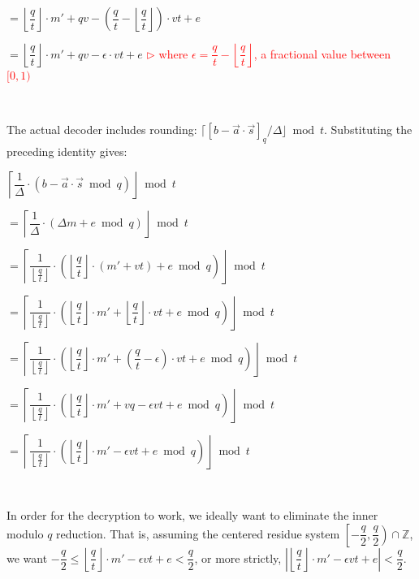 $= \left\lfloor\dfrac{q}{t}\right\rfloor\cdot m' + qv - \left(\dfrac{q}{t} - \left\lfloor\dfrac{q}{t}\right\rfloor\right)\cdot vt + e$

$= \left\lfloor\dfrac{q}{t}\right\rfloor\cdot m' + qv - \epsilon \cdot vt + e$ \textcolor{red}{ $\rhd$ where $\epsilon = \dfrac{q}{t} - \left\lfloor\dfrac{q}{t}\right\rfloor$, a fractional value between $[0, 1)$}

$ $

The actual decoder includes rounding: $\lceil [b-\vec a\cdot\vec s]_q/\Delta\rfloor\bmod t$. Substituting the preceding identity gives:



$\left\lceil\dfrac{1}{\Delta} \cdot \left(b - \vec{a}\cdot\vec{s} \bmod q\right)\right\rfloor \bmod t$

$= \left\lceil\dfrac{1}{\Delta} \cdot \left(\Delta m + e \bmod q\right)\right\rfloor \bmod t$

$= \left\lceil\dfrac{1}{\left\lfloor\frac{q}{t}\right\rfloor} \cdot \left(\left\lfloor\dfrac{q}{t}\right\rfloor \cdot (m' + vt) + e \bmod q\right)\right\rfloor \bmod t$

$= \left\lceil\dfrac{1}{\left\lfloor\frac{q}{t}\right\rfloor} \cdot \left(\left\lfloor\dfrac{q}{t}\right\rfloor \cdot m' + \left\lfloor\dfrac{q}{t}\right\rfloor\cdot vt + e \bmod q\right)\right\rfloor \bmod t$

$= \left\lceil\dfrac{1}{\left\lfloor\frac{q}{t}\right\rfloor} \cdot \left(\left\lfloor\dfrac{q}{t}\right\rfloor \cdot m' + \left(\dfrac{q}{t} - \epsilon \right)\cdot vt + e \bmod q\right)\right\rfloor \bmod t$

$= \left\lceil\dfrac{1}{\left\lfloor\frac{q}{t}\right\rfloor} \cdot \left(\left\lfloor\dfrac{q}{t}\right\rfloor \cdot m' + vq - \epsilon vt + e \bmod q\right)\right\rfloor \bmod t$


$= \left\lceil\dfrac{1}{\left\lfloor\frac{q}{t}\right\rfloor} \cdot \left(\left\lfloor\dfrac{q}{t}\right\rfloor\cdot m'  - \epsilon vt + e \bmod q \right)\right\rfloor \bmod t$ 

$ $

In order for the decryption to work, we ideally want to eliminate the inner modulo $q$ reduction. That is, assuming the centered residue system $\left[-\dfrac{q}{2}, \dfrac{q}{2}\right)\cap\mathbb Z$, we want $-\dfrac{q}{2} \leq \left\lfloor\dfrac{q}{t}\right\rfloor\cdot m'  - \epsilon vt + e < \dfrac{q}{2}$, or more strictly, $\left|\left\lfloor\dfrac{q}{t}\right\rfloor\cdot m'  - \epsilon vt + e\right| < \dfrac{q}{2}$.

